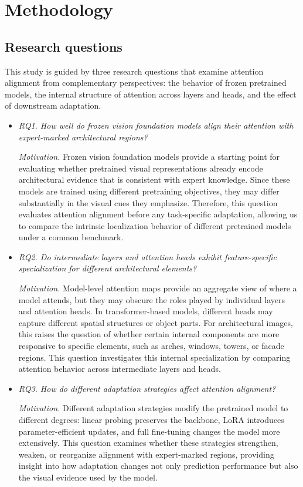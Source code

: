 \documentclass[lineno,pdflatex,sn-mathphys-num]{sn-jnl}%
\theoremstyle{thmstyleone}%
\theoremstyle{thmstyletwo}%
\theoremstyle{thmstylethree}%
\begin{document}
\section{Methodology} \label{section proposed approach}

\subsection{Research questions}

This study is guided by three research questions that examine attention alignment from complementary perspectives: the behavior of frozen pretrained models, the internal structure of attention across layers and heads, and the effect of downstream adaptation.

\begin{itemize}
\item \textit{RQ1. How well do frozen vision foundation models align their attention with expert-marked architectural regions?}

\textit{Motivation.} Frozen vision foundation models provide a starting point for evaluating whether pretrained visual representations already encode architectural evidence that is consistent with expert knowledge. Since these models are trained using different pretraining objectives, they may differ substantially in the visual cues they emphasize. Therefore, this question evaluates attention alignment before any task-specific adaptation, allowing us to compare the intrinsic localization behavior of different pretrained models under a common benchmark.

\item \textit{RQ2. Do intermediate layers and attention heads exhibit feature-specific specialization for different architectural elements?}

\textit{Motivation.} Model-level attention maps provide an aggregate view of where a model attends, but they may obscure the roles played by individual layers and attention heads. In transformer-based models, different heads may capture different spatial structures or object parts. For architectural images, this raises the question of whether certain internal components are more responsive to specific elements, such as arches, windows, towers, or facade regions. This question investigates this internal specialization by comparing attention behavior across intermediate layers and heads.
\item \textit{RQ3. How do different adaptation strategies affect attention alignment?}

\textit{Motivation.} Different adaptation strategies modify the pretrained model to different degrees: linear probing preserves the backbone, LoRA introduces parameter-efficient updates, and full fine-tuning changes the model more extensively. This question examines whether these strategies strengthen, weaken, or reorganize alignment with expert-marked regions, providing insight into how adaptation changes not only prediction performance but also the visual evidence used by the model.
\end{itemize}
\end{document}
